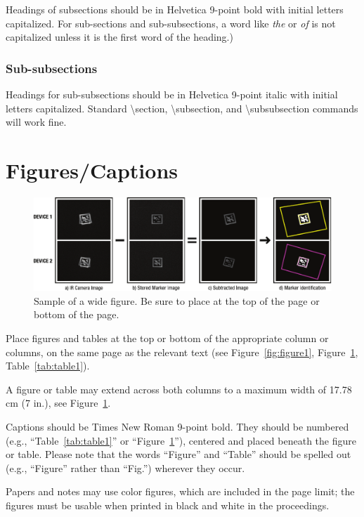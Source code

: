 \documentclass{sigchi}
\begin{document}
Headings of subsections should be in Helvetica 9-point bold with
initial letters capitalized.  For
sub-sections and sub-subsections, a word like \emph{the} or \emph{of}
is not capitalized unless it is the first word of the heading.)

\subsubsection{Sub-subsections}

Headings for sub-subsections should be in Helvetica 9-point italic
with initial letters capitalized.  Standard {\textbackslash}section,
{\textbackslash}subsection, and {\textbackslash}subsubsection commands
will work fine.

\section{Figures/Captions}

\begin{figure}[!t]
\centering
\includegraphics[width=2.0\columnwidth]{Figure2}
\caption{Sample of a wide figure. Be sure to place at the top of the page or bottom of the page.}
\label{fig:figure2}
\end{figure}

Place figures and tables at the top or bottom of the appropriate
column or columns, on the same page as the relevant text
(see Figure~\ref{fig:figure1}, Figure~\ref{fig:figure2}, Table~\ref{tab:table1}). 

A figure or table may extend across both
columns to a maximum width of 17.78 cm (7 in.), see Figure~\ref{fig:figure2}.

Captions should be Times New Roman 9-point bold.  They should be numbered (e.g.,
``Table~\ref{tab:table1}'' or ``Figure~\ref{fig:figure2}''), centered
and placed beneath the figure or table.  Please note that the words
``Figure'' and ``Table'' should be spelled out (e.g., ``Figure''
rather than ``Fig.'') wherever they occur.

Papers and notes may use color figures, which are included in the page
limit; the figures must be usable when printed in black and white in
the proceedings.  
\end{document}

